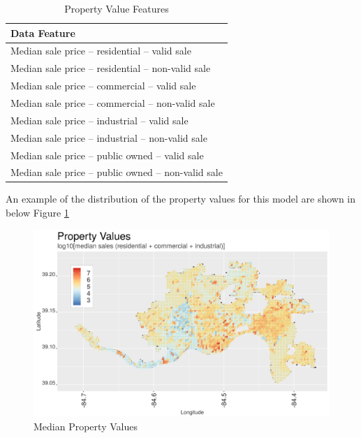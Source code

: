 \documentclass{llncs}
\begin{document}

\FloatBarrier
\begin{table}[!h]
\begin{center}
\caption{Property Value Features}
\label{table : propertyVaueFeatures}
\begin{tabular}{ p{}}
\hline
\rule{0pt}{12pt}
Data Feature	\\
\hline
Median sale price – residential – valid sale\\
Median sale price – residential – non-valid sale\\
Median sale price – commercial – valid sale\\
Median sale price – commercial – non-valid sale\\
Median sale price – industrial – valid sale\\
Median sale price – industrial – non-valid sale\\
Median sale price – public owned – valid sale\\
Median sale price – public owned – non-valid sale \\[2pt]
\hline
\end{tabular}
\end{center}
\end{table}
\FloatBarrier
%

An example of the distribution of the property values for this model are shown in below Figure \ref{figure : medianpropertyvalues}

\FloatBarrier
\begin{figure}
 	\includegraphics[width=\textwidth, height=\textheight, keepaspectratio]{propertyValuesMedianAllY}
 	\caption{Median Property Values}
	\label{figure : medianpropertyvalues}
\end{figure}
\FloatBarrier
\end{document}
